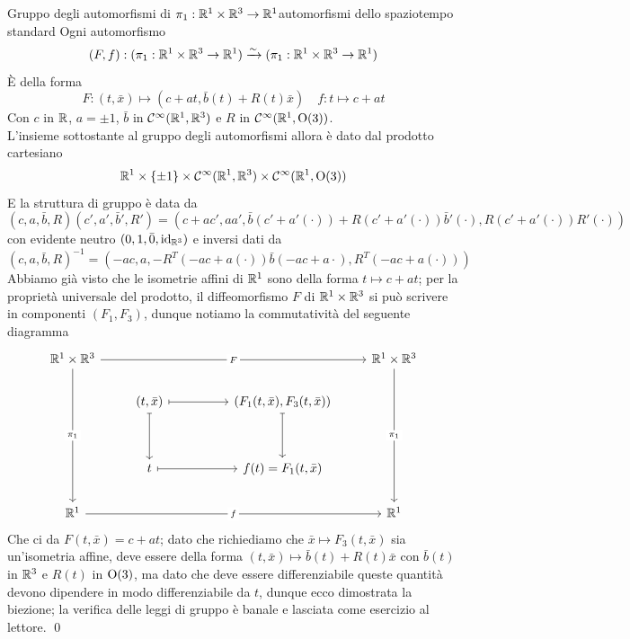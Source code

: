 \documentclass[openany]{book}
\renewcommand\C{\mc{C}}
\begin{document}
\begin{proposition}{Gruppo degli automorfismi di $\pi_1:\mathbb{R}^1\times\mathbb{R}^3\to\mathbb{R}^1$}{automorfismi dello spaziotempo standard}
    Ogni automorfismo 
    \[ (F,f): (\pi_1:\mathbb{R}^1\times\mathbb{R}^3\to\mathbb{R}^1)\xrightarrow{\sim} (\pi_1:\mathbb{R}^1\times\mathbb{R}^3\to\mathbb{R}^1) \]
    È della forma 
    \[ F: (t,\bar{x}) \mapsto (c+at, \bar{b}(t) + R(t)\bar{x} ) \quad f:t\mapsto c+at \]
    Con $c$ in $\mathbb{R}$, $a =\pm 1$, $\bar{b}$ in $\C^{\infty}(\R^1,\R^3)$ e $R$ in $\C^{\infty}(\R^1,\O(3))$.\\
    L'insieme sottostante al gruppo degli automorfismi allora è dato dal prodotto cartesiano
    \[ \R^1\times \{\pm 1\} \times \C^{\infty}(\R^1,\R^3) \times \C^{\infty}(\R^1,\O(3)) \]
    E la struttura di gruppo è data da
    \[ (c,a,\bar{b},R)(c', a', \bar{b}', R') = (c+ac', aa', \bar{b}(c'+a'(\cdot))+R(c'+a'(\cdot))\bar{b}'(\cdot) , R(c'+a'(\cdot))R'(\cdot) ) \]
    con evidente neutro $(0,1, \bar{0},\operatorname{id}_{\mathbb{R}^3})$ e inversi dati da
    \[ (c,a,\bar{b}, R)^{-1} = (-ac, a, -R^T(-ac+a(\cdot))\bar{b}(-ac+a\cdot), R^T(-ac+a(\cdot)) ) \]
    \proof 
    Abbiamo già visto che le isometrie affini di $\mathbb{R}^1$ sono della forma $t\mapsto c+at$; per la proprietà universale del prodotto, il diffeomorfismo $F$ di $\mathbb{R}^1\times\mathbb{R}^3$ si può scrivere in componenti $(F_1, F_3)$, dunque notiamo la commutatività del seguente diagramma 
    \[\begin{tikzcd}
    	{\R^1\times \R^3} &&&& {\R^1\times\R^3} \\
	    & {(t,\bar{x})} && {(F_1(t,\bar{x}),F_3(t,\bar{x}))} \\
	    \\
	    & t && {f(t) = F_{1}(t,\bar{x})} \\
	    {\R^1} &&&& {\R^1}
	    \arrow["F"{description}, from=1-1, to=1-5]
	    \arrow["{\pi_1}"{description}, from=1-1, to=5-1]
	    \arrow["{\pi_1}"{description}, from=1-5, to=5-5]
	    \arrow[maps to, from=2-2, to=2-4]
	    \arrow[maps to, from=2-2, to=4-2]
	    \arrow[maps to, from=2-4, to=4-4]
	    \arrow[maps to, from=4-2, to=4-4]
	    \arrow["f"{description}, from=5-1, to=5-5]
    \end{tikzcd}\]
    Che ci da $F(t,\bar{x}) = c+at$; dato che richiediamo che $\bar{x}\mapsto F_3(t,\bar{x})$ sia un'isometria affine, deve essere della forma $(t,\bar{x})\mapsto  \bar{b}(t)+ R(t)\bar{x}$ con $\bar{b}(t)$ in $\mathbb{R}^3$ e $R(t)$ in $\operatorname{O}(3)$, ma dato che deve essere differenziabile queste quantità devono dipendere in modo differenziabile da $t$, dunque ecco dimostrata la biezione; la verifica delle leggi di gruppo è banale e lasciata come esercizio al lettore.
    \qed
\end{proposition}
\end{document}
